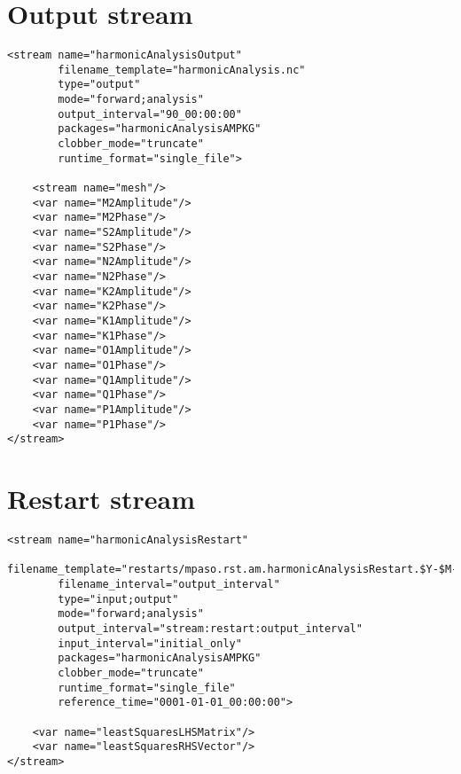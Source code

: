 \documentclass[11pt]{report}
\begin{document}
\section{Output stream}
\begin{verbatim}
<stream name="harmonicAnalysisOutput"
        filename_template="harmonicAnalysis.nc"
        type="output"
        mode="forward;analysis"
        output_interval="90_00:00:00"
        packages="harmonicAnalysisAMPKG"
        clobber_mode="truncate"
        runtime_format="single_file">

    <stream name="mesh"/>
    <var name="M2Amplitude"/>
    <var name="M2Phase"/>
    <var name="S2Amplitude"/>
    <var name="S2Phase"/>
    <var name="N2Amplitude"/>
    <var name="N2Phase"/>
    <var name="K2Amplitude"/>
    <var name="K2Phase"/>
    <var name="K1Amplitude"/>
    <var name="K1Phase"/>
    <var name="O1Amplitude"/>
    <var name="O1Phase"/>
    <var name="Q1Amplitude"/>
    <var name="Q1Phase"/>
    <var name="P1Amplitude"/>
    <var name="P1Phase"/>
</stream>
\end{verbatim}

\section{Restart stream}
\begin{verbatim}
<stream name="harmonicAnalysisRestart"
        filename_template="restarts/mpaso.rst.am.harmonicAnalysisRestart.$Y-$M-$D_$h.$m.$s.nc"
        filename_interval="output_interval"
        type="input;output"
        mode="forward;analysis"
        output_interval="stream:restart:output_interval"
        input_interval="initial_only"
        packages="harmonicAnalysisAMPKG"
        clobber_mode="truncate"
        runtime_format="single_file"
        reference_time="0001-01-01_00:00:00">

    <var name="leastSquaresLHSMatrix"/>
    <var name="leastSquaresRHSVector"/>
</stream>    
\end{verbatim}
\end{document}
